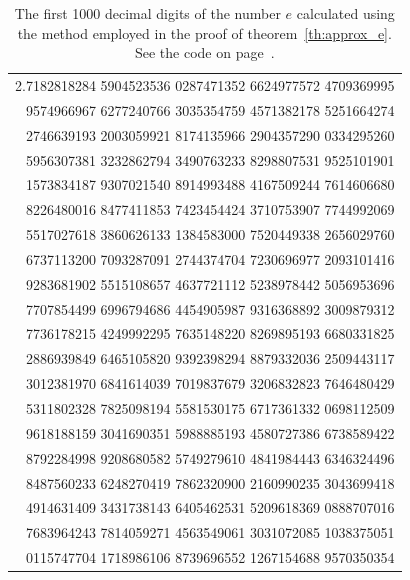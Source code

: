 \begin{table}
\begin{center}
\begin{tabular}{r}
\ttfamily\footnotesize 2.7182818284 5904523536 0287471352 6624977572 4709369995 \\
\ttfamily\footnotesize   9574966967 6277240766 3035354759 4571382178 5251664274 \\
\ttfamily\footnotesize   2746639193 2003059921 8174135966 2904357290 0334295260 \\
\ttfamily\footnotesize   5956307381 3232862794 3490763233 8298807531 9525101901 \\
\ttfamily\footnotesize   1573834187 9307021540 8914993488 4167509244 7614606680 \\
\ttfamily\footnotesize   8226480016 8477411853 7423454424 3710753907 7744992069 \\
\ttfamily\footnotesize   5517027618 3860626133 1384583000 7520449338 2656029760 \\
\ttfamily\footnotesize   6737113200 7093287091 2744374704 7230696977 2093101416 \\
\ttfamily\footnotesize   9283681902 5515108657 4637721112 5238978442 5056953696 \\
\ttfamily\footnotesize   7707854499 6996794686 4454905987 9316368892 3009879312 \\
\ttfamily\footnotesize   7736178215 4249992295 7635148220 8269895193 6680331825 \\
\ttfamily\footnotesize   2886939849 6465105820 9392398294 8879332036 2509443117 \\
\ttfamily\footnotesize   3012381970 6841614039 7019837679 3206832823 7646480429 \\
\ttfamily\footnotesize   5311802328 7825098194 5581530175 6717361332 0698112509 \\
\ttfamily\footnotesize   9618188159 3041690351 5988885193 4580727386 6738589422 \\
\ttfamily\footnotesize   8792284998 9208680582 5749279610 4841984443 6346324496 \\
\ttfamily\footnotesize   8487560233 6248270419 7862320900 2160990235 3043699418 \\
\ttfamily\footnotesize   4914631409 3431738143 6405462531 5209618369 0888707016 \\
\ttfamily\footnotesize   7683964243 7814059271 4563549061 3031072085 1038375051 \\
\ttfamily\footnotesize   0115747704 1718986106 8739696552 1267154688 9570350354
\end{tabular}
\end{center}
\caption{The first 1000 decimal digits of the number $e$
calculated using the method employed in the proof
of theorem~\ref{th:approx_e}.
See the code on page~\pageref{code:compute_e}.}
\label{fig:cifre_e}
\end{table}

